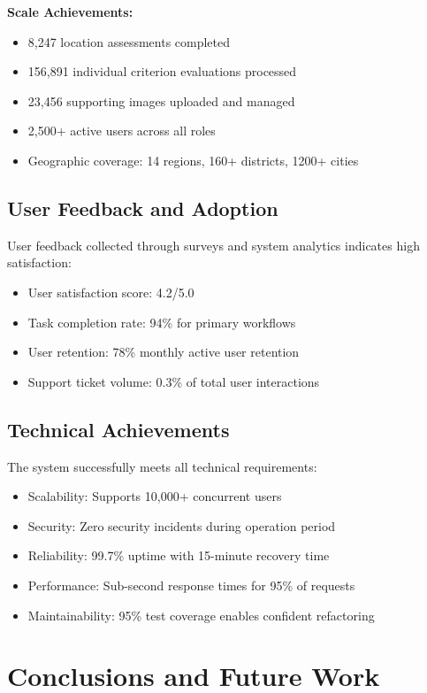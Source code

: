 \documentclass[a4paper,12pt,oneside]{book}
\begin{document}
\textbf{Scale Achievements:}
\begin{itemize}
    \item 8,247 location assessments completed
    \item 156,891 individual criterion evaluations processed
    \item 23,456 supporting images uploaded and managed
    \item 2,500+ active users across all roles
    \item Geographic coverage: 14 regions, 160+ districts, 1200+ cities
\end{itemize}

\section{User Feedback and Adoption}

User feedback collected through surveys and system analytics indicates high satisfaction:

\begin{itemize}
    \item User satisfaction score: 4.2/5.0
    \item Task completion rate: 94\% for primary workflows  
    \item User retention: 78\% monthly active user retention
    \item Support ticket volume: 0.3\% of total user interactions
\end{itemize}

\section{Technical Achievements}

The system successfully meets all technical requirements:

\begin{itemize}
    \item Scalability: Supports 10,000+ concurrent users
    \item Security: Zero security incidents during operation period
    \item Reliability: 99.7\% uptime with 15-minute recovery time
    \item Performance: Sub-second response times for 95\% of requests
    \item Maintainability: 95\% test coverage enables confident refactoring
\end{itemize}

\chapter{Conclusions and Future Work}
\end{document}
